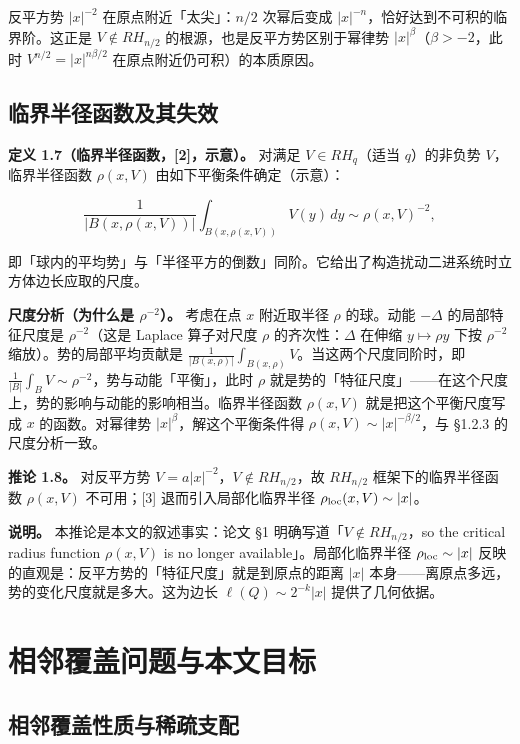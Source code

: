 \documentclass[a4paper,11pt,openany]{ctexbook}
\numberwithin{equation}{chapter}
\numberwithin{figure}{chapter}
\numberwithin{table}{chapter}
\begin{document}
\begin{intuitionbox}
反平方势 $|x|^{-2}$ 在原点附近「太尖」：$n/2$ 次幂后变成 $|x|^{-n}$，恰好达到不可积的临界阶。这正是 $V\notin RH_{n/2}$ 的根源，也是反平方势区别于幂律势 $|x|^\beta$（$\beta>-2$，此时 $V^{n/2}=|x|^{n\beta/2}$ 在原点附近仍可积）的本质原因。
\end{intuitionbox}

\subsection{临界半径函数及其失效}

\textbf{定义 1.7（临界半径函数，[2]，示意）。} 对满足 $V\in RH_q$（适当 $q$）的非负势 $V$，临界半径函数 $\rho(x,V)$ 由如下平衡条件确定（示意）：

$$\frac1{|B(x,\rho(x,V))|}\int_{B(x,\rho(x,V))} V(y)\,dy \sim \rho(x,V)^{-2},$$

即「球内的平均势」与「半径平方的倒数」同阶。它给出了构造扰动二进系统时立方体边长应取的尺度。

\textbf{尺度分析（为什么是 $\rho^{-2}$）。} 考虑在点 $x$ 附近取半径 $\rho$ 的球。动能 $-\Delta$ 的局部特征尺度是 $\rho^{-2}$（这是 Laplace 算子对尺度 $\rho$ 的齐次性：$\Delta$ 在伸缩 $y\mapsto\rho y$ 下按 $\rho^{-2}$ 缩放）。势的局部平均贡献是 $\frac1{|B(x,\rho)|}\int_{B(x,\rho)}V$。当这两个尺度同阶时，即 $\frac1{|B|}\int_B V\sim\rho^{-2}$，势与动能「平衡」，此时 $\rho$ 就是势的「特征尺度」——在这个尺度上，势的影响与动能的影响相当。临界半径函数 $\rho(x,V)$ 就是把这个平衡尺度写成 $x$ 的函数。对幂律势 $|x|^\beta$，解这个平衡条件得 $\rho(x,V)\sim|x|^{-\beta/2}$，与 §1.2.3 的尺度分析一致。

\textbf{推论 1.8。} 对反平方势 $V=a|x|^{-2}$，$V\notin RH_{n/2}$，故 $RH_{n/2}$ 框架下的临界半径函数 $\rho(x,V)$ 不可用；[3] 退而引入局部化临界半径 $\rho_{\rm loc}(x,V)\sim|x|$。

\textbf{说明。} 本推论是本文的叙述事实：论文 §1 明确写道「$V\notin RH_{n/2}$，so the critical radius function $\rho(x,V)$ is no longer available」。局部化临界半径 $\rho_{\rm loc}\sim|x|$ 反映的直观是：反平方势的「特征尺度」就是到原点的距离 $|x|$ 本身——离原点多远，势的变化尺度就是多大。这为边长 $\ell(Q)\sim 2^{-k}|x|$ 提供了几何依据。

\section{相邻覆盖问题与本文目标}

\subsection{相邻覆盖性质与稀疏支配}
\end{document}
